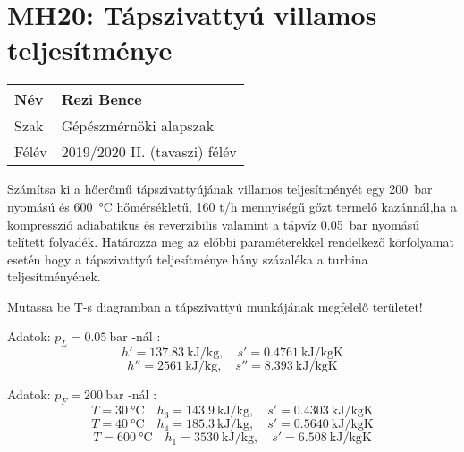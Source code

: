 
	\section*{MH20: Tápszivattyú villamos teljesítménye}
	\begin{tabular}{ | p{2cm} | p{14cm} | } 
		\hline
		Név & Rezi Bence \\ 
		\hline
		Szak & Gépészmérnöki alapszak \\ 
		\hline
		Félév & 2019/2020 II. (tavaszi) félév \\ 
		\hline
	\end{tabular}
	\vspace{0.5cm}

	\noindent 	Számítsa ki a hőerőmű tápszivattyújának villamos teljesítményét egy \SI{200}{\bar} nyomású és \SI{600}{\celsius} hőmérsékletű, 160 t/h mennyiségű gőzt termelő kazánnál,ha a kompresszió adiabatikus és reverzibilis valamint a tápvíz \SI{0,05}{\bar} nyomású telített folyadék. Határozza meg az előbbi paraméterekkel rendelkező körfolyamat esetén hogy a tápszivattyú teljesítménye hány százaléka a turbina teljesítményének.

	\vspace{2mm}
	\noindent Mutassa be T-s diagramban a tápszivattyú munkájának megfelelő területet! 

	\vspace{5mm}
	\noindent Adatok: $p_L = \SI{0,05}{\bar}$ -nál :
	\begin{equation*}
	h' = \SI{137,83}{\kilo\joule\per\kilogram},
	\quad
	s' = \SI{0,4761}{\kilo\joule\per\kilogram\kelvin}
	\end{equation*}
	\begin{equation*}
	h'' = \SI{2561}{\kilo\joule\per\kilogram},
	\quad
	s'' = \SI{8,393}{\kilo\joule\per\kilogram\kelvin}
	\end{equation*}

	\vspace{2mm}
	\noindent Adatok: $p_F = \SI{200}{\bar}$ -nál :
	\begin{equation*}
	T  =\SI{30}{\celsius}
	\quad
	h_3 = \SI{143,9}{\kilo\joule\per\kilogram},
	\quad
	s' = \SI{0,4303}{\kilo\joule\per\kilogram\kelvin}
	\end{equation*}
	\begin{equation*}
	T  =\SI{40}{\celsius}
	\quad
	h_4 = \SI{185,3}{\kilo\joule\per\kilogram},
	\quad
	s' = \SI{0,5640}{\kilo\joule\per\kilogram\kelvin}
	\end{equation*}
	\begin{equation*}
	T  =\SI{600}{\celsius}
	\quad
	h_1 = \SI{3530}{\kilo\joule\per\kilogram},
	\quad
	s' = \SI{6,508}{\kilo\joule\per\kilogram\kelvin}
	\end{equation*}
	\vspace{5mm}

